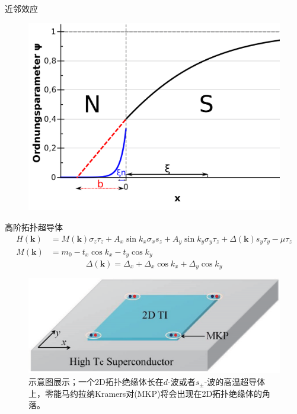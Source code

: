 \documentclass[10pt,aspectratio=169]{beamer} %
\begin{document}
\begin{frame}{近邻效应}
\begin{figure}[h]
\centering
\includegraphics[scale=0.15]{pic/pro}\label{fig5}
\end{figure}	
\end{frame}
\begin{frame}{高阶拓扑超导体}
\begin{equation}
\begin{aligned}
H(\mathbf{k})&=M(\mathbf{k})\sigma_z\tau_z+A_x\sin k_x\sigma_xs_z+A_y\sin k_y\sigma_y\tau_z+\Delta(\mathbf{k})s_y\tau_y-\mu\tau_z\\
M(\mathbf{k})&=m_0-t_x\cos k_x-t_y\cos k_y\label{hoti2}
\end{aligned}
\end{equation}
\begin{equation}
\Delta(\mathbf{k})=\Delta_x+\Delta_x\cos k_x+\Delta_y\cos k_y
\end{equation}
\begin{figure}[h]
\centering
\includegraphics[scale=0.4]{pic/fig8}
\caption{示意图展示；一个2D拓扑绝缘体长在$d$-波或者$s_\pm$-波的高温超导体上，零能马约拉纳Kramers对(MKP)将会出现在2D拓扑绝缘体的角落。}\label{fig8}
\end{figure}
\end{frame}
\end{document}
